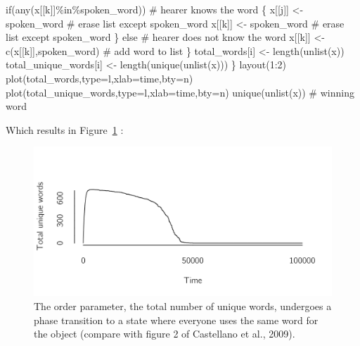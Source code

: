 \documentclass[
  a4paper,
  DIV=11,
  numbers=noendperiod,
  oneside]{scrreprt}
\newenvironment{Shaded}{\begin{snugshade}}{\end{snugshade}}
\newcommand{\AttributeTok}[1]{\textcolor[rgb]{0.40,0.45,0.13}{#1}}
\newcommand{\CommentTok}[1]{\textcolor[rgb]{0.37,0.37,0.37}{#1}}
\newcommand{\ControlFlowTok}[1]{\textcolor[rgb]{0.00,0.23,0.31}{#1}}
\newcommand{\DecValTok}[1]{\textcolor[rgb]{0.68,0.00,0.00}{#1}}
\newcommand{\FunctionTok}[1]{\textcolor[rgb]{0.28,0.35,0.67}{#1}}
\newcommand{\NormalTok}[1]{\textcolor[rgb]{0.00,0.23,0.31}{#1}}
\newcommand{\OtherTok}[1]{\textcolor[rgb]{0.00,0.23,0.31}{#1}}
\newcommand{\SpecialCharTok}[1]{\textcolor[rgb]{0.37,0.37,0.37}{#1}}
\newcommand{\StringTok}[1]{\textcolor[rgb]{0.13,0.47,0.30}{#1}}
\begin{document}
\begin{Shaded}
\begin{Highlighting}[]
    \ControlFlowTok{if}\NormalTok{(}\FunctionTok{any}\NormalTok{(x[[k]]}\SpecialCharTok{\%in\%}\NormalTok{spoken\_word)) }\CommentTok{\# hearer knows the word}
\NormalTok{    \{}
\NormalTok{      x[[j]] }\OtherTok{\textless{}{-}}\NormalTok{ spoken\_word }\CommentTok{\# erase list except spoken\_word}
\NormalTok{      x[[k]] }\OtherTok{\textless{}{-}}\NormalTok{ spoken\_word }\CommentTok{\# erase list except spoken\_word}
\NormalTok{    \} }\ControlFlowTok{else} \CommentTok{\# hearer does not know the word}
\NormalTok{      x[[k]] }\OtherTok{\textless{}{-}} \FunctionTok{c}\NormalTok{(x[[k]],spoken\_word)  }\CommentTok{\# add word to list}
\NormalTok{  \} }
\NormalTok{  total\_words[i] }\OtherTok{\textless{}{-}} \FunctionTok{length}\NormalTok{(}\FunctionTok{unlist}\NormalTok{(x))}
\NormalTok{  total\_unique\_words[i] }\OtherTok{\textless{}{-}} \FunctionTok{length}\NormalTok{(}\FunctionTok{unique}\NormalTok{(}\FunctionTok{unlist}\NormalTok{(x)))}
\NormalTok{\}}
\FunctionTok{layout}\NormalTok{(}\DecValTok{1}\SpecialCharTok{:}\DecValTok{2}\NormalTok{)}
\FunctionTok{plot}\NormalTok{(total\_words,}\AttributeTok{type=}\StringTok{\textquotesingle{}l\textquotesingle{}}\NormalTok{,}\AttributeTok{xlab=}\StringTok{\textquotesingle{}time\textquotesingle{}}\NormalTok{,}\AttributeTok{bty=}\StringTok{\textquotesingle{}n\textquotesingle{}}\NormalTok{)}
\FunctionTok{plot}\NormalTok{(total\_unique\_words,}\AttributeTok{type=}\StringTok{\textquotesingle{}l\textquotesingle{}}\NormalTok{,}\AttributeTok{xlab=}\StringTok{\textquotesingle{}time\textquotesingle{}}\NormalTok{,}\AttributeTok{bty=}\StringTok{\textquotesingle{}n\textquotesingle{}}\NormalTok{)}
\FunctionTok{unique}\NormalTok{(}\FunctionTok{unlist}\NormalTok{(x)) }\CommentTok{\# winning word}
\end{Highlighting}
\end{Shaded}

Which results in Figure~\ref{fig-ch7-img3-old-91} :

\begin{figure}

{\centering \includegraphics{media/ch7/fig-ch7-img3-old-91.png}

}

\caption{\label{fig-ch7-img3-old-91}The order parameter, the total
number of unique words, undergoes a phase transition to a state where
everyone uses the same word for the object (compare with figure 2 of
Castellano et al., 2009).}

\end{figure}
\end{document}
